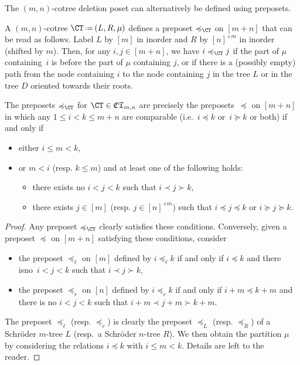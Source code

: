 \documentclass[AHL,Unicode,longabstracts,published]{cedram}
\newcommand{\f}[1]{\mathfrak{#1}}
\newcommand{\eqdef}{\mbox{\,\raisebox{0.2ex}{\scriptsize\ensuremath{\mathrm:}}\ensuremath{=}\,}}
\newcommand{\ie}{i.e.~}
\begin{document}
The $(m,n)$-cotree deletion poset can alternatively be defined using preposets.

\begin{defi}\label{def:cotreePreposet}
A $(m,n)$-cotree $\CT \eqdef (L, R, \mu)$ defines a preposet $\preccurlyeq_{\CT}$ on $[m+n]$ that can be read as follows. Label $L$ by $[m]$ in inorder and $R$ by $[n]^{+m}$ in inorder (shifted by $m$). Then, for any $i,j \in [m+n]$, we have $i \preccurlyeq_{\CT} j$ if the part of $\mu$ containing~$i$ is before the part of $\mu$ containing $j$, or if there is a (possibly empty) path from the node containing $i$ to the node containing $j$ in the tree $L$ or in the tree $D$ oriented towards their roots.
\end{defi}

\begin{prop}\label{prop:characterizationCotreePreposets}
The preposets $\preccurlyeq_{\CT}$ for $\CT \in \f{CT}_{m,n}$ are precisely the preposets~$\preccurlyeq$ on $[m+n]$ in which any $1 \le i < k \le m+n$ are comparable (\ie $i \preccurlyeq k$ or~$i \succcurlyeq k$ or both) if and only if
\begin{itemize}
\item either $i \le m < k$,
\item or $m < i$ (resp. $k \le m$) and at least one of the following holds:
\begin{itemize}
\item there exists no $i < j < k$ such that $i \prec j \succ k$,
\item there exists $j \in [m]$ (resp. $j \in [n]^{+m}$) such that $i \preccurlyeq j \preccurlyeq k$ or $i \succcurlyeq j \succcurlyeq k$.
\end{itemize}
\end{itemize}
\end{prop}

\begin{proof}
Any preposet $\preccurlyeq_{\CT}$ clearly satisfies these conditions. Conversely, given a preposet $\preccurlyeq$ on ${[m+n]}$ satisfying these conditions, consider
\begin{itemize}
\item the preposet $\preccurlyeq_\ell$ on $[m]$ defined by $i \preccurlyeq_\ell k$ if and only if $i \preccurlyeq k$ and there is\linebreak no~$i < j < k$ such that $i \prec j \succ k$,
\item the preposet $\preccurlyeq_r$ on $[n]$ defined by $i \preccurlyeq_r k$ if and only if ${i + m \preccurlyeq k+m}$ and there is no ${i < j < k}$ such that $i + m \prec j + m \succ k + m$.
\end{itemize}
The preposet $\preccurlyeq_\ell$ (resp. $\preccurlyeq_r$) is clearly the preposet $\preccurlyeq_L$ (resp. $\preccurlyeq_R$) of a Schr\"oder $m$-tree $L$ (resp.~a Schr\"oder $n$-tree $R$). We then obtain the partition $\mu$ by considering the relations $i \preccurlyeq k$ with ${i \le m < k}$. Details are left to the reader.
\end{proof}
\end{document}
